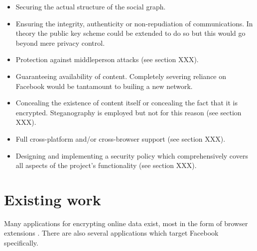 \begin{itemize}

    \item Securing the actual structure of the social graph.
    
    \item Ensuring the integrity, authenticity or non-repudiation of communications. In theory the public key scheme could be extended to do so but this would go beyond mere privacy control.

    \item Protection against middleperson attacks (see section XXX).
    
    \item Guaranteeing availability of content. Completely severing reliance on Facebook would be tantamount to builing a new network.
    
    \item Concealing the existence of content itself or concealing the fact that it is encrypted. Steganography is employed but not for this reason (see section XXX).
    
    \item Full cross-platform and/or cross-browser support (see section XXX).
    
    \item Designing and implementing a security policy which comprehensively covers all aspects of the project's functionality (see section XXX).
    
\end{itemize}


\section{Existing work}
\label{sec:existing}

    Many applications for encrypting online data exist, most in the form of browser extensions \cite{firegpg} \cite{cryptfire} \cite{textcrypt}. There are also several applications which target Facebook specifically.
    
